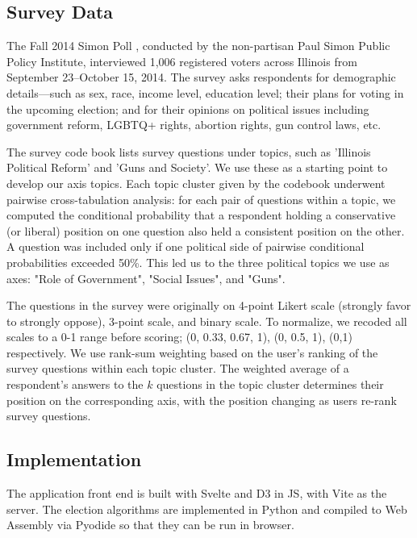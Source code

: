 \subsection{Survey Data}%
\label{sub:Survey Data}
The Fall 2014 Simon Poll \cite{simon}, conducted by the non-partisan Paul Simon Public
Policy Institute, interviewed 1,006 registered voters across Illinois from
September 23--October 15, 2014.
%
The survey asks respondents for demographic details---such as
sex, race, income level, education level; their plans for voting in the upcoming election;
and for their opinions on political issues including
government reform, LGBTQ+ rights, abortion rights, gun control laws, etc.

The survey code book lists survey questions under topics, such as 'Illinois Political Reform' and 'Guns and Society'.
We use these as a starting point to develop our axis topics. Each topic cluster given by the codebook
underwent pairwise cross-tabulation analysis: for each pair of questions within a topic,
we computed the conditional probability that a respondent holding a conservative
(or liberal) position on one question also held a consistent position on the
other. A question was included only if one political side of pairwise conditional probabilities
exceeded 50\%. This led us to the three political topics we use as axes:
"Role of Government", "Social Issues", and "Guns".

The questions in the survey were originally on
4-point Likert scale (strongly favor to strongly oppose), 3-point scale, and binary scale.
To normalize, we recoded all scales to a 0-1 range before scoring; 
(0, 0.33, 0.67, 1), (0, 0.5, 1), (0,1) respectively.
We use rank-sum weighting based on the user's ranking of the survey questions within each topic cluster.
The weighted average of a respondent's answers to the $k$ questions in the 
topic cluster determines their position on the corresponding axis, with the position changing as
users re-rank survey questions.

\subsection{Implementation}%
\label{sub:Implementation}
The application front end is built with Svelte and D3 in JS,
with Vite as the server.
The election algorithms are implemented in Python and
compiled to Web Assembly via Pyodide so that they can be run in browser.

